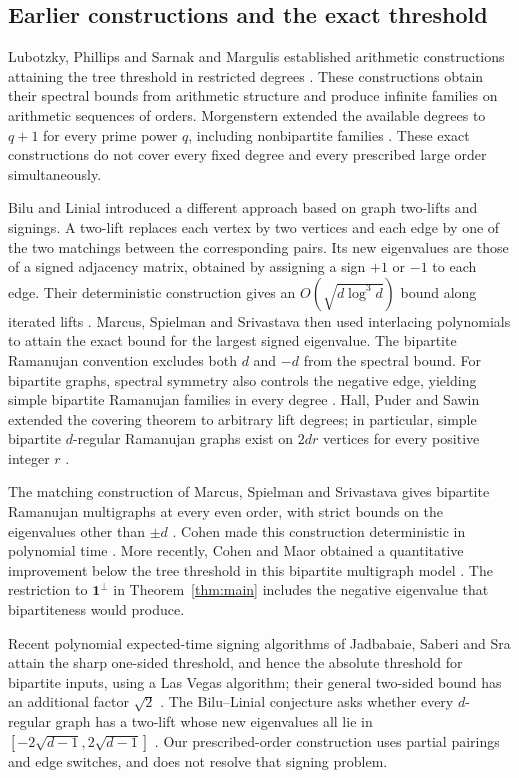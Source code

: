 \subsection{Earlier constructions and the exact threshold}

Lubotzky, Phillips and Sarnak and Margulis established arithmetic
constructions attaining the tree threshold in restricted degrees
\cite{LPS1988,Margulis1988}. These constructions obtain their spectral
bounds from arithmetic structure and produce infinite families on
arithmetic sequences of orders. Morgenstern extended the available degrees to $q+1$
for every prime power $q$, including nonbipartite families
\cite{Morgenstern1994}. These exact constructions do not cover every
fixed degree and every prescribed large order simultaneously.

Bilu and Linial introduced a different approach based on graph
two-lifts and signings. A two-lift replaces each vertex by two vertices
and each edge by one of the two matchings between the corresponding
pairs. Its new eigenvalues are those of a signed adjacency matrix,
obtained by assigning a sign $+1$ or $-1$ to each edge.
Their deterministic construction gives an
$O(\sqrt{d\log^3 d})$ bound along iterated lifts
\cite{BL2006}. Marcus, Spielman and Srivastava then used interlacing
polynomials to attain the exact bound for the largest signed eigenvalue.
The bipartite Ramanujan convention excludes both $d$ and $-d$ from the
spectral bound. For bipartite graphs, spectral symmetry also controls the negative edge,
yielding simple bipartite Ramanujan families in every degree
\cite[Theorems~5.3 and~5.5]{MSS2015}.
Hall, Puder and Sawin extended the covering theorem to arbitrary lift
degrees; in particular, simple bipartite $d$-regular Ramanujan graphs
exist on $2dr$ vertices for every positive integer $r$
\cite[Theorem~1.2 and Corollary~2.2]{HPS2018}.

The matching construction of Marcus, Spielman and Srivastava gives
bipartite Ramanujan multigraphs at every even order, with strict bounds
on the eigenvalues other than $\pm d$
\cite[Theorem~1.1]{MSS2018}. Cohen made this construction deterministic
in polynomial time \cite{Cohen2016}. More recently, Cohen and Maor
obtained a quantitative improvement below the tree threshold in this
bipartite multigraph model \cite[Theorem~1.2]{CM2026}.
The restriction to $\mathbf1^\perp$ in Theorem~\ref{thm:main} includes
the negative eigenvalue that bipartiteness would produce.

Recent polynomial expected-time signing algorithms of Jadbabaie,
Saberi and Sra attain the sharp one-sided threshold, and hence the
absolute threshold for bipartite inputs, using a Las Vegas algorithm;
their general two-sided bound has an additional factor $\sqrt2$
\cite[Theorem~6.1]{JSS2026}.
The Bilu--Linial conjecture asks whether every $d$-regular graph has a
two-lift whose new eigenvalues all lie in
$[-2\sqrt{d-1},2\sqrt{d-1}]$ \cite[Conjecture~3.1]{BL2006}.
Our prescribed-order construction uses partial pairings and edge
switches, and does not resolve that signing problem.

